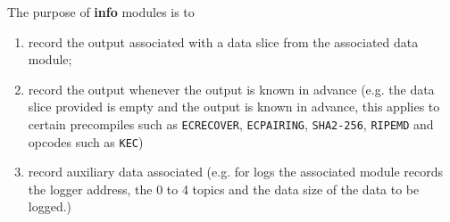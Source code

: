 The purpose of \textbf{info} modules is to
\begin{enumerate}
\item record the output associated with a data slice from the associated data module;
\item record the output whenever the output is known in advance (e.g. the data slice provided is empty and the output is known in advance, this applies to certain precompiles such as \texttt{ECRECOVER}, \texttt{ECPAIRING}, \texttt{SHA2-256}, \texttt{RIPEMD} and opcodes such as \texttt{KEC})
\item record auxiliary data associated (e.g. for logs the associated  module records the logger address, the 0 to 4 topics and the data size of the data to be logged.)
\end{enumerate}
